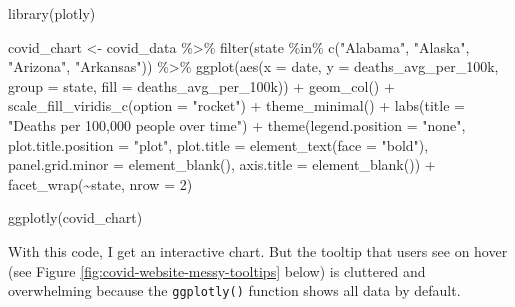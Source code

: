 \documentclass[
]{book}
\newenvironment{Shaded}{\begin{snugshade}}{\end{snugshade}}
\newcommand{\AttributeTok}[1]{\textcolor[rgb]{0.77,0.63,0.00}{#1}}
\newcommand{\DecValTok}[1]{\textcolor[rgb]{0.00,0.00,0.81}{#1}}
\newcommand{\FunctionTok}[1]{\textcolor[rgb]{0.00,0.00,0.00}{#1}}
\newcommand{\NormalTok}[1]{#1}
\newcommand{\OtherTok}[1]{\textcolor[rgb]{0.56,0.35,0.01}{#1}}
\newcommand{\SpecialCharTok}[1]{\textcolor[rgb]{0.00,0.00,0.00}{#1}}
\newcommand{\StringTok}[1]{\textcolor[rgb]{0.31,0.60,0.02}{#1}}
\begin{document}
\begin{Shaded}
\begin{Highlighting}[]
\FunctionTok{library}\NormalTok{(plotly)}

\NormalTok{covid\_chart }\OtherTok{\textless{}{-}}\NormalTok{ covid\_data }\SpecialCharTok{\%\textgreater{}\%} 
  \FunctionTok{filter}\NormalTok{(state }\SpecialCharTok{\%in\%} \FunctionTok{c}\NormalTok{(}\StringTok{"Alabama"}\NormalTok{,}
                      \StringTok{"Alaska"}\NormalTok{,}
                      \StringTok{"Arizona"}\NormalTok{,}
                      \StringTok{"Arkansas"}\NormalTok{)) }\SpecialCharTok{\%\textgreater{}\%} 
  \FunctionTok{ggplot}\NormalTok{(}\FunctionTok{aes}\NormalTok{(}\AttributeTok{x =}\NormalTok{ date,}
             \AttributeTok{y =}\NormalTok{ deaths\_avg\_per\_100k,}
             \AttributeTok{group =}\NormalTok{ state,}
             \AttributeTok{fill =}\NormalTok{ deaths\_avg\_per\_100k)) }\SpecialCharTok{+}
  \FunctionTok{geom\_col}\NormalTok{() }\SpecialCharTok{+}
  \FunctionTok{scale\_fill\_viridis\_c}\NormalTok{(}\AttributeTok{option =} \StringTok{"rocket"}\NormalTok{) }\SpecialCharTok{+}
  \FunctionTok{theme\_minimal}\NormalTok{() }\SpecialCharTok{+}
  \FunctionTok{labs}\NormalTok{(}\AttributeTok{title =} \StringTok{"Deaths per 100,000 people over time"}\NormalTok{) }\SpecialCharTok{+}
  \FunctionTok{theme}\NormalTok{(}\AttributeTok{legend.position =} \StringTok{"none"}\NormalTok{,}
        \AttributeTok{plot.title.position =} \StringTok{"plot"}\NormalTok{,}
        \AttributeTok{plot.title =} \FunctionTok{element\_text}\NormalTok{(}\AttributeTok{face =} \StringTok{"bold"}\NormalTok{),}
        \AttributeTok{panel.grid.minor =} \FunctionTok{element\_blank}\NormalTok{(),}
        \AttributeTok{axis.title =} \FunctionTok{element\_blank}\NormalTok{()) }\SpecialCharTok{+}
  \FunctionTok{facet\_wrap}\NormalTok{(}\SpecialCharTok{\textasciitilde{}}\NormalTok{state,}
             \AttributeTok{nrow =} \DecValTok{2}\NormalTok{)}


\FunctionTok{ggplotly}\NormalTok{(covid\_chart)}
\end{Highlighting}
\end{Shaded}

With this code, I get an interactive chart. But the tooltip that users see on hover (see Figure \ref{fig:covid-website-messy-tooltips} below) is cluttered and overwhelming because the \texttt{ggplotly()} function shows all data by default.
\end{document}
